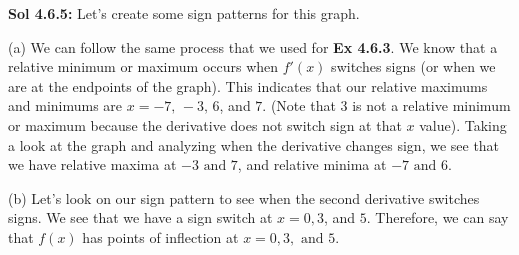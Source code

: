 \begin{tcolorbox}[solution]
    \textbf{Sol 4.6.5: } Let's create some sign patterns for this graph. \\
    \begin{center}
    \end{center} \vspace{11pt}
    \begin{center}
    \end{center} \vspace{11pt}
    (a) We can follow the same process that we used for \textbf{Ex 4.6.3}. We know that a relative minimum or maximum occurs when $f'(x)$ switches signs (or when we are at the endpoints of the graph). This indicates that our relative maximums and minimums are $x = -7, \, -3, \, 6$, and $7$. (Note that $3$ is not a relative minimum or maximum because the derivative does not switch sign at that $x$ value). Taking a look at the graph and analyzing when the derivative changes sign, we see that we have relative maxima at $\boxed{-3 \text{ and } 7}$, and relative minima at $\boxed{-7 \text{ and } 6}$. \par 
    \vspace{11pt}
    (b) Let's look on our sign pattern to see when the second derivative switches signs. We see that we have a sign switch at $x = 0, 3$, and $5$. Therefore, we can say that $f(x)$ has points of inflection at $\boxed{x = 0, 3, \text{ and } 5}$.
\end{tcolorbox}

